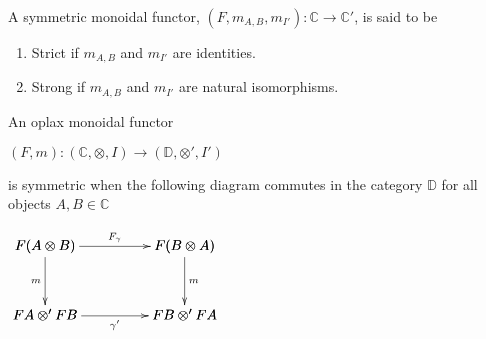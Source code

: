 \begin{definition}
    A symmetric monoidal functor, $(F,m_{A,B},m_{I'}): \mathbb{C} \rightarrow \mathbb{C}'$, is said to be
    \begin{enumerate}
        \item Strict if $m_{A,B}$ and $m_{I'}$ are identities.
        \item Strong if $m_{A,B}$ and $m_{I'}$ are natural isomorphisms.
    \end{enumerate}
    \cite{bierman1993}
\end{definition}


\begin{definition}
    An oplax monoidal functor
    \begin{center}
        \begin{math}
            (F,m) : (\mathbb{C}, \otimes, I) \rightarrow (\mathbb{D}, \otimes ', I')
        \end{math}
    \end{center}
    is symmetric when the following diagram commutes in the category $\mathbb{D}$ for all objects $A,B \in \mathbb{C}$
    \begin{center}
        \begin{math}
            \bfig
                \square<1000,500>[
                    F(A \otimes B)`
                    F(B \otimes A)`
                    FA \otimes ' FB`
                    FB \otimes ' FA;
                    F_\gamma`
                    m`
                    m`
                    \gamma '
                ]
            \efig
        \end{math}
    \end{center}
    \cite{mellies2009}
\end{definition}

